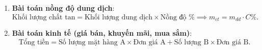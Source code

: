 \begin{enumerate}
\item \textbf{Bài toán nồng độ dung dịch}:
$$\text{Khối lượng chất tan} = \text{Khối lượng dung dịch} \times \text{Nồng độ \%} \implies m_{ct} = m_{dd} \cdot C\%.$$
\item \textbf{Bài toán kinh tế (giá bán, khuyến mãi, mua sắm)}:
$$\text{Tổng tiền} = \text{Số lượng mặt hàng A} \times \text{Đơn giá A} + \text{Số lượng B} \times \text{Đơn giá B}.$$
\end{enumerate}
